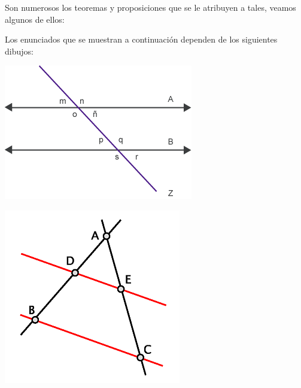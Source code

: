 \documentclass{apuntes}
\begin{document}
Son numerosos los teoremas y proposiciones que se le atribuyen a tales, veamos algunos de ellos:
\begin{theorem}
Los enunciados que se muestran a continuación dependen de los siguientes dibujos:

\begin{minipage}{0.57\textwidth}
\begin{center}
\includegraphics[width=\linewidth/2]{img/tales1.png}
\end{center}
\end{minipage}
\begin{minipage}{0.40\textwidth}
\begin{center}
\includegraphics[width=\linewidth/2]{img/tales2.png}
\end{center}
\end{minipage}


\end{theorem}
\end{document}
